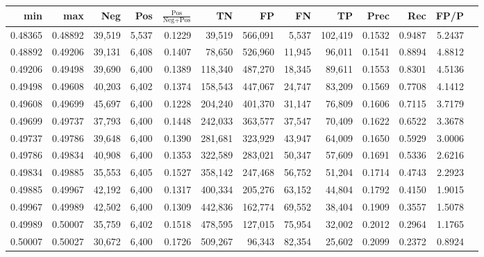 \begin{tabular}{rrrrrrrrrrrrr}
\toprule
    min &     max &    Neg &   Pos & $\frac{\text{Pos}}{\text{Neg}+\text{Pos}}$ &      TN &      FP &      FN &      TP &   Prec &    Rec &   FP/P \\
\midrule
0.48365 & 0.48892 & 39,519 & 5,537 &                                     0.1229 &  39,519 & 566,091 &   5,537 & 102,419 & 0.1532 & 0.9487 & 5.2437 \\
0.48892 & 0.49206 & 39,131 & 6,408 &                                     0.1407 &  78,650 & 526,960 &  11,945 &  96,011 & 0.1541 & 0.8894 & 4.8812 \\
0.49206 & 0.49498 & 39,690 & 6,400 &                                     0.1389 & 118,340 & 487,270 &  18,345 &  89,611 & 0.1553 & 0.8301 & 4.5136 \\
0.49498 & 0.49608 & 40,203 & 6,402 &                                     0.1374 & 158,543 & 447,067 &  24,747 &  83,209 & 0.1569 & 0.7708 & 4.1412 \\
0.49608 & 0.49699 & 45,697 & 6,400 &                                     0.1228 & 204,240 & 401,370 &  31,147 &  76,809 & 0.1606 & 0.7115 & 3.7179 \\
0.49699 & 0.49737 & 37,793 & 6,400 &                                     0.1448 & 242,033 & 363,577 &  37,547 &  70,409 & 0.1622 & 0.6522 & 3.3678 \\
0.49737 & 0.49786 & 39,648 & 6,400 &                                     0.1390 & 281,681 & 323,929 &  43,947 &  64,009 & 0.1650 & 0.5929 & 3.0006 \\
0.49786 & 0.49834 & 40,908 & 6,400 &                                     0.1353 & 322,589 & 283,021 &  50,347 &  57,609 & 0.1691 & 0.5336 & 2.6216 \\
0.49834 & 0.49885 & 35,553 & 6,405 &                                     0.1527 & 358,142 & 247,468 &  56,752 &  51,204 & 0.1714 & 0.4743 & 2.2923 \\
0.49885 & 0.49967 & 42,192 & 6,400 &                                     0.1317 & 400,334 & 205,276 &  63,152 &  44,804 & 0.1792 & 0.4150 & 1.9015 \\
0.49967 & 0.49989 & 42,502 & 6,400 &                                     0.1309 & 442,836 & 162,774 &  69,552 &  38,404 & 0.1909 & 0.3557 & 1.5078 \\
0.49989 & 0.50007 & 35,759 & 6,402 &                                     0.1518 & 478,595 & 127,015 &  75,954 &  32,002 & 0.2012 & 0.2964 & 1.1765 \\
0.50007 & 0.50027 & 30,672 & 6,400 &                                     0.1726 & 509,267 &  96,343 &  82,354 &  25,602 & 0.2099 & 0.2372 & 0.8924 \\

\end{tabular}
